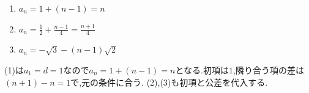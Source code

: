     \noindent{}\par\nobreak
    \begin{enumerate}[label=(\arabic*),parsep=3pt,format=\bookitemlink{example-arithmetic-1}{answer}{problem}]
      \item $\displaystyle a_n=1+(n-1)=n$
      \item $\displaystyle a_n=\frac12+\frac{n-1}{4}
            =\frac{n+1}{4}$
      \item $\displaystyle a_n=-\sqrt3-(n-1)\sqrt2$
    \end{enumerate}

    \noindent{}\par\nobreak
    (1)は$a_1=d=1$なので$a_n=1+(n-1)=n$となる.初項は$1$,隣り合う項の差は$(n+1)-n=1$で,元の条件に合う.
    (2),(3)も初項と公差を代入する.
